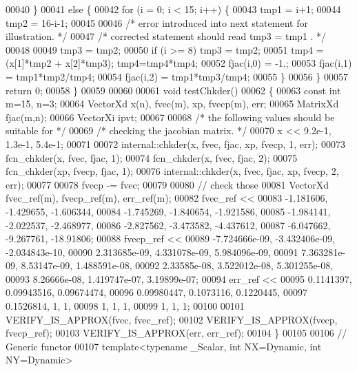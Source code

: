 \begin{DoxyCode}
00040         \}
00041     \textcolor{keywordflow}{else} \{
00042         \textcolor{keywordflow}{for} (i = 0; i < 15; i++) \{
00043             tmp1 = i+1;
00044             tmp2 = 16-i-1;
00045 
00046             \textcolor{comment}{/* error introduced into next statement for illustration. */}
00047             \textcolor{comment}{/* corrected statement should read    tmp3 = tmp1 . */}
00048 
00049             tmp3 = tmp2;
00050             \textcolor{keywordflow}{if} (i >= 8) tmp3 = tmp2;
00051             tmp4 = (x[1]*tmp2 + x[2]*tmp3); tmp4=tmp4*tmp4;
00052             fjac(i,0) = -1.;
00053             fjac(i,1) = tmp1*tmp2/tmp4;
00054             fjac(i,2) = tmp1*tmp3/tmp4;
00055         \}
00056     \}
00057     \textcolor{keywordflow}{return} 0;
00058 \}
00059 
00060 
00061 \textcolor{keywordtype}{void} testChkder()
00062 \{
00063   \textcolor{keyword}{const} \textcolor{keywordtype}{int} m=15, n=3;
00064   VectorXd x(n), fvec(m), xp, fvecp(m), err;
00065   MatrixXd fjac(m,n);
00066   VectorXi ipvt;
00067 
00068   \textcolor{comment}{/*      the following values should be suitable for */}
00069   \textcolor{comment}{/*      checking the jacobian matrix. */}
00070   x << 9.2e-1, 1.3e-1, 5.4e-1;
00071 
00072   internal::chkder(x, fvec, fjac, xp, fvecp, 1, err);
00073   fcn\_chkder(x, fvec, fjac, 1);
00074   fcn\_chkder(x, fvec, fjac, 2);
00075   fcn\_chkder(xp, fvecp, fjac, 1);
00076   internal::chkder(x, fvec, fjac, xp, fvecp, 2, err);
00077 
00078   fvecp -= fvec;
00079 
00080   \textcolor{comment}{// check those}
00081   VectorXd fvec\_ref(m), fvecp\_ref(m), err\_ref(m);
00082   fvec\_ref <<
00083       -1.181606, -1.429655, -1.606344,
00084       -1.745269, -1.840654, -1.921586,
00085       -1.984141, -2.022537, -2.468977,
00086       -2.827562, -3.473582, -4.437612,
00087       -6.047662, -9.267761, -18.91806;
00088   fvecp\_ref <<
00089       -7.724666e-09, -3.432406e-09, -2.034843e-10,
00090       2.313685e-09,  4.331078e-09,  5.984096e-09,
00091       7.363281e-09,   8.53147e-09,  1.488591e-08,
00092       2.33585e-08,  3.522012e-08,  5.301255e-08,
00093       8.26666e-08,  1.419747e-07,   3.19899e-07;
00094   err\_ref <<
00095       0.1141397,  0.09943516,  0.09674474,
00096       0.09980447,  0.1073116, 0.1220445,
00097       0.1526814, 1, 1,
00098       1, 1, 1,
00099       1, 1, 1;
00100 
00101   VERIFY\_IS\_APPROX(fvec, fvec\_ref);
00102   VERIFY\_IS\_APPROX(fvecp, fvecp\_ref);
00103   VERIFY\_IS\_APPROX(err, err\_ref);
00104 \}
00105 
00106 \textcolor{comment}{// Generic functor}
00107 \textcolor{keyword}{template}<\textcolor{keyword}{typename} \_Scalar, \textcolor{keywordtype}{int} NX=Dynamic, \textcolor{keywordtype}{int} NY=Dynamic>

\end{DoxyCode}
